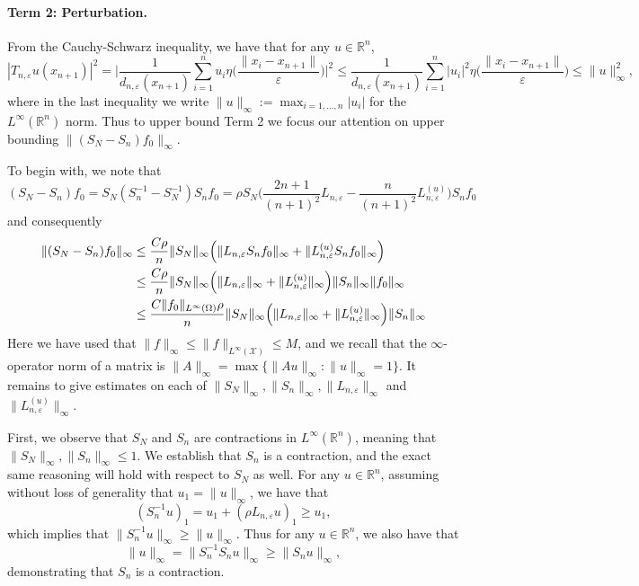 \documentclass{article}
\newcommand{\Reals}{\mathbb{R}}
\newcommand{\1}{\mathbf{1}}
\newcommand{\mc}[1]{\mathcal{#1}}
\theoremstyle{alden}
\theoremstyle{aldenthm}
\theoremstyle{definition}
\theoremstyle{remark}
\begin{document}
\paragraph{Term 2: Perturbation.}
From the Cauchy-Schwarz inequality, we have that for any $u \in \Reals^n$,
\begin{equation*}
|T_{n,\varepsilon}u(x_{n + 1})|^2 = \biggl|\frac{1}{d_{n,\varepsilon}(x_{n + 1})} \sum_{i = 1}^{n} u_i \eta\biggl(\frac{\|x_i - x_{n + 1}\|}{\varepsilon}\biggr)\biggr|^2 \leq \frac{1}{d_{n,\varepsilon}(x_{n + 1})} \sum_{i = 1}^{n} |u_i|^2 \eta\biggl(\frac{\|x_{i} - x_{n + 1}\|}{\varepsilon}\biggr) \leq \|u\|_{\infty}^2,
\end{equation*}
where in the last inequality we write $\|u\|_{\infty} := \max_{i = 1,\ldots,n} |u_i|$ for the $L^{\infty}(\Reals^n)$ norm. Thus to upper bound Term 2 we focus our attention on upper bounding $\|(S_N - S_n)f_0\|_{\infty}$. 

To begin with, we note that
\begin{equation*}
(S_N - S_n)f_0 = S_N(S_n^{-1} - S_N^{-1})S_nf_0 = \rho S_N\biggl(\frac{2n + 1}{(n + 1)^2}L_{n,\varepsilon} - \frac{n}{(n + 1)^2}L_{n,\varepsilon}^{(u)}\biggr)S_nf_0 
\end{equation*}
and consequently
\begin{align}
\label{pf:out_of_sample_laplacian_regularization_3}
\|(S_N - S_n)f_0\|_{\infty} & \leq \frac{C\rho}{n}\|S_N\|_{\infty}\Bigl(\|L_{n,\varepsilon}S_nf_0\|_{\infty} + \|L_{n,\varepsilon}^{(u)}S_nf_0\|_{\infty}\Bigr) \nonumber \\
& \leq \frac{C\rho}{n}\|S_N\|_{\infty}\Bigl(\|L_{n,\varepsilon}\|_{\infty} + \|L_{n,\varepsilon}^{(u)}\|_{\infty}\Bigr) \|S_n\|_{\infty} \|f_0\|_{\infty} \nonumber \\
& \leq \frac{C\|f_0\|_{L^{\infty}(\Omega)}\rho}{n}\|S_N\|_{\infty}\Bigl(\|L_{n,\varepsilon}\|_{\infty} + \|L_{n,\varepsilon}^{(u)}\|_{\infty}\Bigr) \|S_n\|_{\infty} 
\end{align}
Here we have used that $\|f\|_{\infty} \leq \|f\|_{L^{\infty}(\mc{X})} \leq M$, and we recall that the $\infty$-operator norm of a matrix is $\|A\|_{\infty} = \max\{\|Au\|_{\infty}:\|u\|_{\infty} = 1\}$. It remains to give estimates on each of $\|S_N\|_{\infty}, \|S_n\|_{\infty}, \|L_{n,\varepsilon}\|_{\infty}$ and $\|L_{n,\varepsilon}^{(u)}\|_{\infty}$.

First, we observe that $S_N$ and $S_n$ are contractions in $L^{\infty}(\Reals^n)$, meaning that $\|S_N\|_{\infty},\|S_n\|_{\infty} \leq 1$. We establish that $S_n$ is a contraction, and the exact same reasoning will hold with respect to $S_N$ as well. For any $u \in \Reals^n$, assuming without loss of generality that $u_1 = \|u\|_{\infty}$, we have that
\begin{equation*}
(S_n^{-1}u)_1 = u_1 + (\rho L_{n,\varepsilon}u)_1 \geq u_1,
\end{equation*}
which implies that $\|S_n^{-1}u\|_{\infty} \geq \|u\|_{\infty}$. Thus for any $u \in \Reals^n$, we also have that
\begin{equation*}
\|u\|_{\infty} = \|S_n^{-1}S_nu\|_{\infty} \geq \|S_nu\|_{\infty},
\end{equation*}
demonstrating that $S_n$ is a contraction. 
\end{document}
